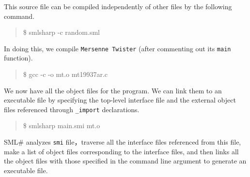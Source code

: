 \documentclass{jbook}
\newcommand{\smlsharp}{SML\#}
\newenvironment{program}{\begin{quote}\begin{tt}}%
                        {\end{tt}\end{quote}}
\begin{document}
	This source file can be compiled independently of other files
by the following command.
\begin{program}
\$ smlsharp -c random.sml
\end{program}
	In doing this, we compile {\tt Mersenne Twister} (after
commenting out its {\tt main} function).
\begin{program}
\$ gcc -c -o mt.o mt19937ar.c
\end{program}
	We now have all the object files for the program.
	We can link them to an executable file by specifying the
top-level interface file and the external object files referenced
through {\tt \_import} declarations.
\begin{program}
\$ smlsharp main.smi mt.o
\end{program}
	\smlsharp{} analyzes {\tt smi} file，traverse all the interface
files referenced from this file, make a list of object files
corresponding to the interface files, and then links all the object
files with those specified in the command line argument to generate an
executable file.
	
\end{document}
